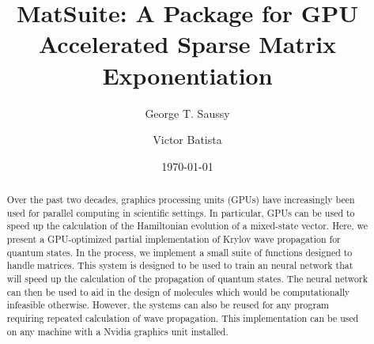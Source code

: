 \documentclass[%
 reprint,
 amsmath,amssymb,
 aps,
]{revtex4-1}
\begin{document}

\title{MatSuite: A Package for GPU Accelerated Sparse Matrix Exponentiation}%

\author{George T. Saussy}
%


\author{Victor Batista}
%


\date{\today}%

\begin{abstract}


Over the past two decades, graphics processing units (GPUs) have increasingly been used for parallel computing in scientific settings. In particular, GPUs can be used to speed up the calculation of the Hamiltonian evolution of a mixed-state vector. Here, we present a GPU-optimized partial implementation of Krylov wave propagation for quantum states. In the process, we implement a small suite of functions designed to handle matrices. This system is designed to be used to train an neural network that will speed up the calculation of the propagation of quantum states. The neural network can then be used to aid in the design of molecules which would be computationally infeasible otherwise. However, the systems can also be reused for any program requiring repeated calculation of wave propagation. This implementation can be used on any machine with a Nvidia graphics unit installed.


\end{abstract}

\maketitle
\end{document}
